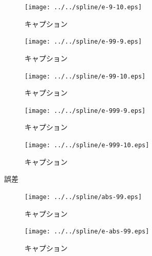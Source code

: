 \documentclass[titlepage, a4paper, 11pt, dvipdfmx]{jsarticle}
\begin{document}
\begin{figure}[H]
  \begin{center}%
    \texttt{[image: ../../spline/e-9-10.eps]}%
  \caption{キャプション}
  \label{Label}%
  \end{center}
\end{figure}


\begin{figure}[H]
  \begin{center}%
    \texttt{[image: ../../spline/e-99-9.eps]}%
  \caption{キャプション}
  \label{Label}%
  \end{center}
\end{figure}


\begin{figure}[H]
  \begin{center}%
    \texttt{[image: ../../spline/e-99-10.eps]}%
  \caption{キャプション}
  \label{Label}%
  \end{center}
\end{figure}


\begin{figure}[H]
  \begin{center}%
    \texttt{[image: ../../spline/e-999-9.eps]}%
  \caption{キャプション}
  \label{Label}%
  \end{center}
\end{figure}


\begin{figure}[H]
  \begin{center}%
    \texttt{[image: ../../spline/e-999-10.eps]}%
  \caption{キャプション}
  \label{Label}%
  \end{center}
\end{figure}

誤差
\begin{figure}[H]
  \begin{center}%
    \texttt{[image: ../../spline/abs-99.eps]}%
  \caption{キャプション}
  \label{Label}%
  \end{center}
\end{figure}


\begin{figure}[H]
  \begin{center}%
    \texttt{[image: ../../spline/e-abs-99.eps]}%
  \caption{キャプション}
  \label{Label}%
  \end{center}
\end{figure}
\end{document}
